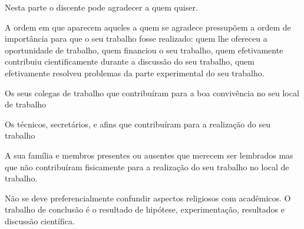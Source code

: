 %
\pagestyle{empty}

\begin{agradecimentos}
\begin{incisos}
\item Nesta parte o discente pode agradecer a quem quiser.
\item A ordem em que aparecem aqueles a quem se agradece pressupõem a ordem de importância para que o seu trabalho fosse realizado: quem lhe ofereceu a oportunidade de trabalho, quem financiou o seu trabalho, quem efetivamente contribuiu cientificamente durante a discussão do seu trabalho, quem efetivamente resolveu problemas da parte experimental do seu trabalho.
\item Os seus colegas de trabalho que contribuíram para a boa convivência no seu local de trabalho
\item Os técnicos, secretários, e afins que contribuíram para a realização do seu trabalho
\item 	A sua família e membros presentes ou ausentes que merecem ser lembrados mas que não contribuíram fisicamente para a realização do seu trabalho no local de trabalho.
\item Não se deve preferencialmente confundir aspectos religiosos com acadêmicos. O trabalho de conclusão é o resultado de hipótese, experimentação, resultados e discussão científica. 
\end{incisos}

\end{agradecimentos}
